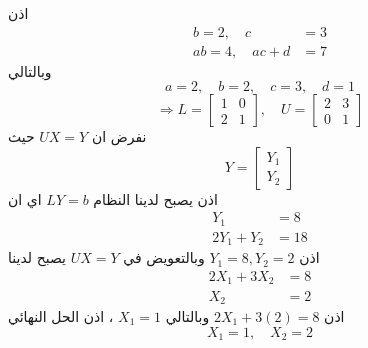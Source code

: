 اذن 
\begin{align*}
	b = 2,\quad
	c&= 3\\
	ab = 4,\quad
	ac + d &= 7 
\end{align*}
وبالتالي
\[
a=2, \quad b=2, \quad c=3, \quad d=1
\]
\[
\Rightarrow 
L = 
\begin{bmatrix}
	1&0\\
	2&1
\end{bmatrix},
\quad
U=
\begin{bmatrix}
	2&3\\
	0&1
\end{bmatrix}
\]
نفرض ان $ UX = Y$ حيث 
\[
Y = 
\begin{bmatrix}
	Y_1\\
	Y_2
\end{bmatrix}
\]
اذن يصبح لدينا النظام $LY= b$ اي ان 
\begin{align*}
	Y_1 &= 8\\
	2Y_1 + Y_2 &= 18
\end{align*}
اذن $Y_1=8, Y_2=2 $ وبالتعويض في $UX = Y$ يصبح لدينا
\begin{align*}
	2X_1 + 3X_2 &= 8\\
	X_2 &= 2
\end{align*}
اذن $2X_1+3(2) = 8 $ وبالتالي $X_1=1 $ ، اذن الحل النهائي
\[
X_1 = 1, \quad X_2 = 2
\]

